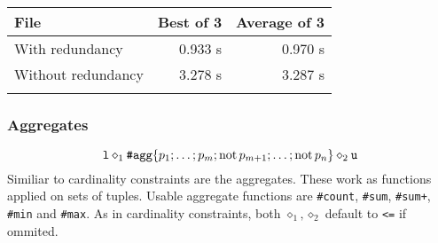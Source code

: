 \documentclass{fithesis}
\begin{document}
{\setlength{\tabcolsep}{0.4em}%
\begin{center}
    \begin{tabular}{l @{\hskip 1em} r r}\toprule{}%
        File               & Best of 3 & Average of 3 \\\midrule{}
        With redundancy    & 0.933 s   & 0.970 s \\
        Without redundancy & 3.278 s   & 3.287 s \\
        \bottomrule{}
    \end{tabular}
\end{center}}\noindent

% 

\subsubsection{Aggregates}

\begin{equation*}
    \texttt{l} \diamond_1 \texttt{\#agg}\{p_1; \dots; p_m; \mathrm{not}\, p_{m+1}; \dots; \mathrm{not}\, p_n\} \diamond_2 \texttt{u}
\end{equation*}
Similiar to cardinality constraints are the aggregates. These work as functions
applied on sets of tuples. Usable aggregate functions are \texttt{\#count},
\texttt{\#sum}, \texttt{\#sum+}, \texttt{\#min} and \texttt{\#max}.
As in cardinality constraints, both $\diamond_1, \diamond_2$ default to 
\texttt{<=} if ommited.
\end{document}
